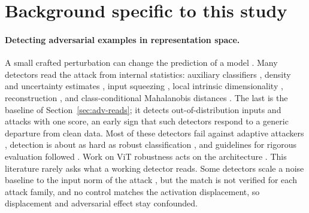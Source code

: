 \documentclass[../ppgc-tese.tex]{subfiles}
\begin{document}

\section{Background specific to this study}
\label{sec:adv-background}

\paragraph*{Detecting adversarial examples in representation space.}
A small crafted perturbation can change the prediction of a model
\cite{goodfellow2015fgsm,madry2018pgd,carlini2017cw_attack}. Many detectors
read the attack from internal statistics: auxiliary classifiers
\cite{metzen2017detecting_adversarial}, density and uncertainty estimates
\cite{feinman2017adversarial_artifacts}, input squeezing
\cite{xu2018feature_squeezing}, local intrinsic dimensionality
\cite{ma2018lid_adversarial}, reconstruction \cite{meng2017magnet}, and
class-conditional Mahalanobis distances \cite{lee2018mahalanobis}. The last is
the baseline of Section~\ref{sec:adv-reads}; it detects out-of-distribution
inputs and attacks with one score, an early sign that such detectors respond to
a generic departure from clean data. Most of these detectors fail against
adaptive attackers
\cite{carlini2017bypassing_detection,sharma2018bypassing_feature_squeezing,athalye2018obfuscated_gradients,tramer2020adaptive_attacks},
detection is about as hard as robust classification
\cite{tramer2022detection_hardness}, and guidelines for rigorous evaluation
followed \cite{carlini2019evaluating_robustness}. Work on ViT robustness acts on
the architecture
\cite{bhojanapalli2021vit_robustness,naseer2021vit_properties,lovisotto2022attention_harmful,huang2023patchcensor}.
This literature rarely asks what a working detector reads. Some detectors scale
a noise baseline to the input norm of the attack
\cite{feinman2017adversarial_artifacts,ma2018lid_adversarial}, but the match is
not verified for each attack family, and no control matches the activation
displacement, so displacement and adversarial effect stay confounded. %
\end{document}
